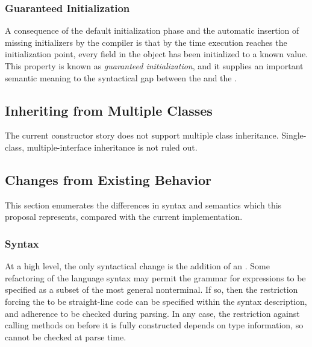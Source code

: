 \subsubsection{Guaranteed Initialization}
\label{Guaranteed_Initialization}

A consequence of the default initialization phase and the automatic insertion of
missing initializers by the compiler is that by the time execution reaches the
initialization point, every field in the object has been initialized to a known
value.  This property is known as \emph{guaranteed initialization}, and it supplies an
important semantic meaning to the syntactical gap between the 
and the .

\subsection{Inheriting from Multiple Classes}
\label{Inheriting_from_Multiple_Classes}

The current constructor story does not support multiple class inheritance.
Single-class, multiple-interface inheritance is not ruled out.

\subsection{Changes from Existing Behavior}

This section enumerates the differences in syntax and semantics which this
proposal represents, compared with the current implementation.

\subsubsection{Syntax}

At a high level, the only syntactical change is the addition of
an .  Some refactoring of the language syntax may
permit the grammar for  expressions to be specified as a
subset of the most general  nonterminal.  If so, then the
restriction forcing the  to be straight-line code
can be specified within the syntax description, and adherence to be checked
during parsing.  In any case, the restriction against calling methods
on  before it is fully constructed depends on type information, so
cannot be checked at parse time.

